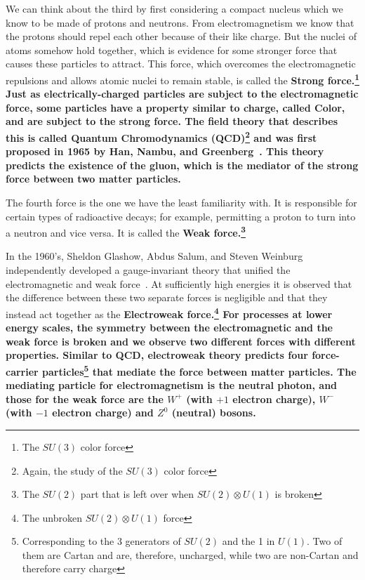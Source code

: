 \documentclass[12pt,epsf]{article}
\begin{document}
We can think about the third by first considering a compact nucleus
which we know to be made of protons and neutrons.  From
electromagnetism we know that the protons should repel each other
because of their like charge.  But the nuclei of atoms somehow hold together,
which is evidence for some stronger force that causes these particles to
attract.  This force, which overcomes the electromagnetic repulsions
and allows atomic nuclei to remain stable, is called the \bf Strong \rm
force.\footnote{The $SU(3)$ color force}  Just as electrically-charged
particles are subject to the electromagnetic force, some particles have
a property similar to charge, called \bf Color\rm, and are subject to
the strong force.  The field theory that describes this is called \bf
Quantum Chromodynamics \rm (QCD)\footnote{Again, the study of the
$SU(3)$ color force} and was first proposed in 1965 by Han, Nambu,
and Greenberg~\cite{Mehra}.  This theory predicts the existence of the
gluon, which is the mediator of the strong force between two matter
particles.

The fourth force is the one we have the least familiarity with.  It is
responsible for certain types of radioactive decays; for example,
permitting a proton to turn into a neutron and vice versa.  It is
called the \bf Weak \rm force.\footnote{The $SU(2)$ part that is left
over when $SU(2)\otimes U(1)$ is broken} 

In the 1960's, Sheldon Glashow, Abdus Salum, and Steven Weinburg
independently developed a gauge-invariant theory that unified the
electromagnetic and weak force~\cite{Mehra}.  At sufficiently high
energies it is observed that the difference between these two separate
forces is negligible and that they instead act together as the \bf
Electroweak \rm force.\footnote{The unbroken $SU(2)\otimes U(1)$ force}
 For processes at lower energy scales, the symmetry between the
electromagnetic and the weak force is broken and we observe two
different forces with different properties.  Similar to QCD,
electroweak theory predicts four force-carrier
particles\footnote{Corresponding to the 3 generators of $SU(2)$ and
the 1 in $U(1)$.  Two of them are Cartan and are, therefore,
uncharged, while two are non-Cartan and therefore carry charge} that
mediate the force between matter particles.  The mediating particle for
electromagnetism is the neutral photon, and those for the weak force are
the $W^+$ (with $+1$ electron charge), $W^-$ (with $-1$ electron
charge) and $Z^0$ (neutral) bosons.
\end{document}
